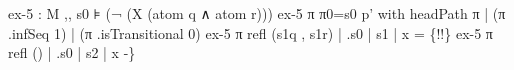 \begin{code}[hide]
{  ex-5 : M ,, s0 ⊧ (¬ (X (atom q ∧ atom r)))
  ex-5 π π0=s0 p'
    with headPath π | (π .infSeq 1) | (π .isTransitional 0)
  ex-5 π refl (s1q , s1r) | .s0 | s1 | x = \{!!\}
  ex-5 π refl () | .s0 | s2 | x
  -\}}\<%
\\
%
\>[2]\AgdaSpace{}%
\AgdaSymbol{:}\AgdaSpace{}%
\AgdaSpace{}%
\AgdaSymbol{(}\AgdaSpace{}%
\AgdaOperator{\AgdaFunction{,,}}\AgdaSpace{}%
\AgdaSpace{}%
\AgdaSpace{}%
\AgdaSpace{}%
\AgdaSymbol{(}\AgdaSpace{}%
\AgdaSpace{}%
\AgdaSpace{}%
\AgdaSpace{}%
\AgdaSymbol{))}\<%
\\
%
\>[2]\AgdaSpace{}%
\AgdaSpace{}%
\AgdaSpace{}%
\AgdaSpace{}%
\AgdaSpace{}%
\<%
\\
%
\>[2]\AgdaSpace{}%
\AgdaSpace{}%
\AgdaSymbol{|}\AgdaSpace{}%
\AgdaSymbol{()}\AgdaSpace{}%
\AgdaOperator{\AgdaInductiveConstructor{,}}\AgdaSpace{}%
\<%
\\
%
\\[\AgdaEmptyExtraSkip]%
%
\>[2]\<%
\\
%
\>[2]\AgdaSpace{}%
\AgdaSymbol{:}\AgdaSpace{}%
\AgdaSpace{}%
\AgdaSymbol{(}\AgdaSpace{}%
\AgdaSymbol{:}\AgdaSpace{}%
\AgdaSymbol{)}\AgdaSpace{}%
\AgdaSpace{}%
\AgdaSymbol{(}\AgdaSpace{}%
\AgdaOperator{\AgdaFunction{,,}}\AgdaSpace{}%
\AgdaSpace{}%
\AgdaSpace{}%
\AgdaSpace{}%
\AgdaSymbol{(}\AgdaSpace{}%
\AgdaSymbol{(}\AgdaSpace{}%
\AgdaSpace{}%
\AgdaSpace{}%
\AgdaSpace{}%
\AgdaSymbol{)))}\<%
\\
%
\>[2]\AgdaSpace{}%
\AgdaSpace{}%
\AgdaSpace{}%
\AgdaSpace{}%
\AgdaSpace{}%
\AgdaSpace{}%
\AgdaSpace{}%

\end{code}
